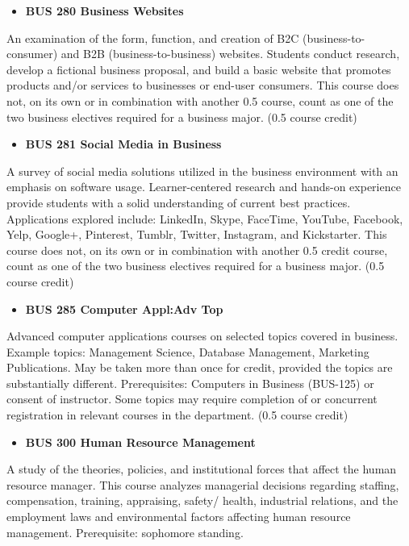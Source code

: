 \documentclass[
  letterpaper,
]{scrbook}
\providecommand{\tightlist}{%
  \setlength{\itemsep}{0pt}\setlength{\parskip}{0pt}}
\begin{document}
\begin{itemize}
\tightlist
\item
  \textbf{BUS 280 Business Websites}
\end{itemize}

An examination of the form, function, and creation of B2C
(business-to-consumer) and B2B (business-to-business) websites. Students
conduct research, develop a fictional business proposal, and build a
basic website that promotes products and/or services to businesses or
end-user consumers. This course does not, on its own or in combination
with another 0.5 course, count as one of the two business electives
required for a business major. (0.5 course credit)

\begin{itemize}
\tightlist
\item
  \textbf{BUS 281 Social Media in Business}
\end{itemize}

A survey of social media solutions utilized in the business environment
with an emphasis on software usage. Learner-centered research and
hands-on experience provide students with a solid understanding of
current best practices. Applications explored include: LinkedIn, Skype,
FaceTime, YouTube, Facebook, Yelp, Google+, Pinterest, Tumblr, Twitter,
Instagram, and Kickstarter. This course does not, on its own or in
combination with another 0.5 credit course, count as one of the two
business electives required for a business major. (0.5 course credit)

\begin{itemize}
\tightlist
\item
  \textbf{BUS 285 Computer Appl:Adv Top}
\end{itemize}

Advanced computer applications courses on selected topics covered in
business. Example topics: Management Science, Database Management,
Marketing Publications. May be taken more than once for credit, provided
the topics are substantially different. Prerequisites: Computers in
Business (BUS-125) or consent of instructor. Some topics may require
completion of or concurrent registration in relevant courses in the
department. (0.5 course credit)

\begin{itemize}
\tightlist
\item
  \textbf{BUS 300 Human Resource Management}
\end{itemize}

A study of the theories, policies, and institutional forces that affect
the human resource manager. This course analyzes managerial decisions
regarding staffing, compensation, training, appraising, safety/ health,
industrial relations, and the employment laws and environmental factors
affecting human resource management. Prerequisite: sophomore standing.
\end{document}
